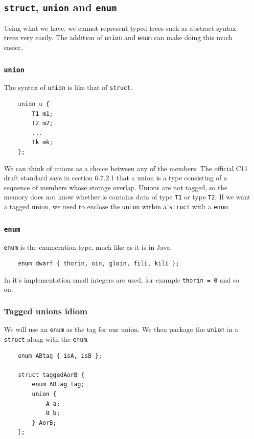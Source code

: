 \documentclass{article}
\begin{document}
	\subsection{\texttt{struct}, \texttt{union} and \texttt{enum}}
	Using what we have, we cannot represent typed trees such as abstract syntax trees very easily. The addition of \texttt{union} and \texttt{enum} can make doing this much easier. 
	
	\subsubsection{\texttt{union}}
	The syntax of \texttt{union} is like that of \texttt{struct}. 
	
	\begin{verbatim}
	union u {
	    T1 m1;
	    T2 m2;
	    ...
	    Tk mk;
	};
	\end{verbatim}
	
	We can think of unions as a choice between any of the members. The official C11 draft standard says in section 6.7.2.1 that a union is a type consisting of a sequence of members whose storage overlap. Unions are not tagged, so the memory does not know whether is contains data of type \texttt{T1} or type \texttt{T2}. If we want a tagged union, we need to enclose the \texttt{union} within a \texttt{struct} with a \texttt{enum}
	
	\subsubsection{\texttt{enum}}
	\texttt{enum} is the enumeration type, much like as it is in Java. 
	
	\begin{verbatim}
	enum dwarf { thorin, oin, gloin, fili, kili };
	\end{verbatim}

	In it's implementation small integers are used, for example \texttt{thorin = 0} and so on.
	
	\subsubsection{Tagged unions idiom}
	We will use an \texttt{enum} as the tag for our union. We then package the \texttt{union} in a \texttt{struct} along with the \texttt{enum}.
	
	\begin{verbatim}
	enum ABtag { isA, isB };
	
	struct taggedAorB {
	    enum ABtag tag;
	    union {
	        A a;
	        B b;
	    } AorB;
	};
	\end{verbatim}
	
\end{document}
